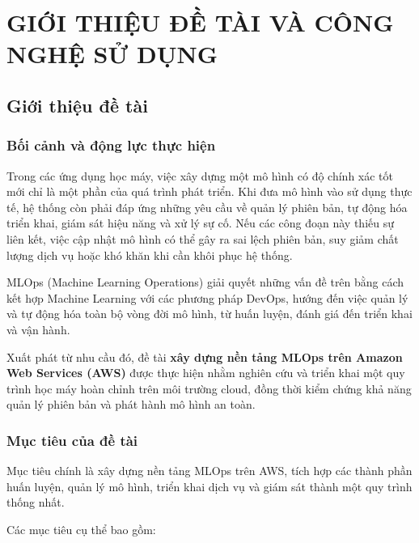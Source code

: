 

\FloatBarrier


\section{GIỚI THIỆU ĐỀ TÀI VÀ CÔNG NGHỆ SỬ DỤNG}


\subsection{Giới thiệu đề tài}


\subsubsection{Bối cảnh và động lực thực hiện}


Trong các ứng dụng học máy, việc xây dựng một mô hình có độ chính xác tốt mới chỉ là một phần của quá trình phát triển. Khi đưa mô hình vào sử dụng thực tế, hệ thống còn phải đáp ứng những yêu cầu về quản lý phiên bản, tự động hóa triển khai, giám sát hiệu năng và xử lý sự cố. Nếu các công đoạn này thiếu sự liên kết, việc cập nhật mô hình có thể gây ra sai lệch phiên bản, suy giảm chất lượng dịch vụ hoặc khó khăn khi cần khôi phục hệ thống.


MLOps (Machine Learning Operations) giải quyết những vấn đề trên bằng cách kết hợp Machine Learning với các phương pháp DevOps, hướng đến việc quản lý và tự động hóa toàn bộ vòng đời mô hình, từ huấn luyện, đánh giá đến triển khai và vận hành.


Xuất phát từ nhu cầu đó, đề tài \textbf{xây dựng nền tảng MLOps trên Amazon Web Services (AWS)} được thực hiện nhằm nghiên cứu và triển khai một quy trình học máy hoàn chỉnh trên môi trường cloud, đồng thời kiểm chứng khả năng quản lý phiên bản và phát hành mô hình an toàn.


\subsubsection{Mục tiêu của đề tài}


Mục tiêu chính là xây dựng nền tảng MLOps trên AWS, tích hợp các thành phần huấn luyện, quản lý mô hình, triển khai dịch vụ và giám sát thành một quy trình thống nhất.


Các mục tiêu cụ thể bao gồm:


